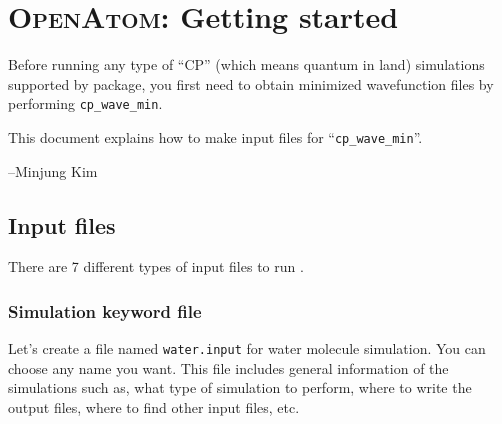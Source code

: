 %
%
%
%
%
%
%
%

\section{\textsc{OpenAtom}: Getting started}

Before running any type of ``CP'' (which means quantum in \openatom land) simulations supported by \openatom package, you first need to obtain minimized wavefunction files by performing \verb+cp_wave_min+.

This document explains how to make input files for ``\verb+cp_wave_min+''.


--Minjung Kim



\subsection{Input files}

There are 7 different types of input files to run \openatom. 

\subsubsection{Simulation keyword file}

Let's create a file named \verb+water.input+ for water molecule simulation. You can choose any name you want. This file includes general information of the simulations such as, what  type of simulation to perform, where to write the output files, where to find other input files, etc. 

